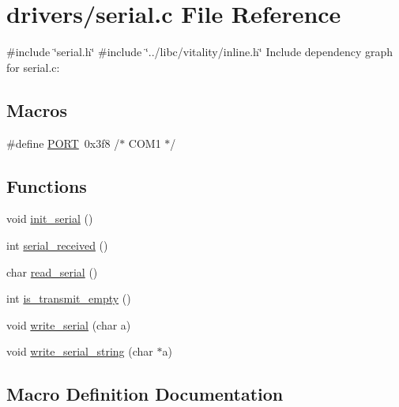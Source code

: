 \hypertarget{a00050}{}\section{drivers/serial.c File Reference}
\label{a00050}
{\ttfamily \#include \char`\"{}serial.\+h\char`\"{}}\newline
{\ttfamily \#include \char`\"{}../libc/vitality/inline.\+h\char`\"{}}\newline
Include dependency graph for serial.\+c\+:
\subsection*{Macros}
\begin{DoxyCompactItemize}
\item 
\#define \hyperlink{a00050_a614217d263be1fb1a5f76e2ff7be19a2_a614217d263be1fb1a5f76e2ff7be19a2}{P\+O\+RT}~0x3f8   /$\ast$ C\+O\+M1 $\ast$/
\end{DoxyCompactItemize}
\subsection*{Functions}
\begin{DoxyCompactItemize}
\item 
void \hyperlink{a00050_acfb6f6d615183fc2f71e79dfbadfe27d_acfb6f6d615183fc2f71e79dfbadfe27d}{init\+\_\+serial} ()
\item 
int \hyperlink{a00050_af10f0e64ba89e8635aa7245ca08297c5_af10f0e64ba89e8635aa7245ca08297c5}{serial\+\_\+received} ()
\item 
char \hyperlink{a00050_ad343a7018f74662f794968dfa0523841_ad343a7018f74662f794968dfa0523841}{read\+\_\+serial} ()
\item 
int \hyperlink{a00050_a01fe5504f7b8f4eee1545737495bae76_a01fe5504f7b8f4eee1545737495bae76}{is\+\_\+transmit\+\_\+empty} ()
\item 
void \hyperlink{a00050_aac3c84e21fffc4696d8969ca6955bfc8_aac3c84e21fffc4696d8969ca6955bfc8}{write\+\_\+serial} (char a)
\item 
void \hyperlink{a00050_aabbe45d6670f606c53ba38a5fb14b650_aabbe45d6670f606c53ba38a5fb14b650}{write\+\_\+serial\+\_\+string} (char $\ast$a)
\end{DoxyCompactItemize}


\subsection{Macro Definition Documentation}
\mbox{\label{a00050_a614217d263be1fb1a5f76e2ff7be19a2_a614217d263be1fb1a5f76e2ff7be19a2}} 
